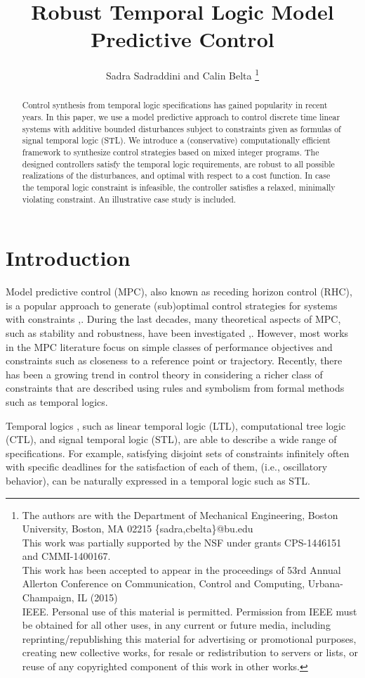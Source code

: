 \documentclass[letterpaper, 10 pt, conference]{ieeeconf}
\title{\LARGE \bf  Robust Temporal Logic Model Predictive Control}
\author{Sadra Sadraddini and Calin Belta 
\thanks{The authors are with the Department of Mechanical Engineering, Boston University, Boston, MA 02215 \{sadra,cbelta\}@bu.edu \\ This work was partially supported by the NSF under grants CPS-1446151 and CMMI-1400167.
\\
This work has been accepted to appear in the proceedings of 53rd Annual Allerton Conference on Communication, Control and Computing, Urbana-Champaign,
IL (2015)
\\
\textcopyright 2015 IEEE. Personal use of this material is permitted. Permission from IEEE must be obtained for all other uses, in any current or future media, including reprinting/republishing this material for advertising or promotional purposes, creating new collective works, for resale or redistribution to servers or lists, or reuse of any copyrighted component of this work in other works. 
}
}
\begin{document}
\maketitle

 \thispagestyle{empty}
\pagestyle{empty}
\makeatother


\begin{abstract}
Control synthesis from temporal logic specifications has gained popularity in recent years. 
In this paper, we use a model predictive approach to control discrete time linear systems with additive bounded disturbances subject to constraints given as formulas of signal temporal logic (STL). 
We introduce a (conservative) computationally efficient framework to synthesize control strategies based on mixed integer programs. The designed controllers satisfy the temporal logic requirements, are robust  to all possible realizations of the disturbances, and optimal with respect to a cost function. In case the temporal logic constraint is infeasible, the controller satisfies  a relaxed, minimally violating constraint.  An illustrative case study is included. 
\end{abstract}

\section{Introduction}
Model predictive control (MPC), also known as receding horizon control (RHC), is a popular approach to generate
(sub)optimal control strategies for systems with constraints \cite{garcia1989model},\cite{camacho2013model}. During the last decades, many theoretical aspects of MPC, such as stability and robustness, have been investigated \cite{Kothare1996},\cite{Mayne2000}. However, most works in the MPC literature focus on simple classes of performance objectives and constraints such as closeness to a reference point or trajectory. Recently, there has been a growing trend in control theory in considering a richer class of constraints that are described using rules and symbolism from formal methods such as temporal logics. 

Temporal logics \cite{Baier2008}, such as linear temporal logic (LTL), computational tree logic (CTL), and signal temporal logic (STL), are able to describe a wide range of specifications. For example, satisfying disjoint sets of constraints infinitely often with specific deadlines for the satisfaction of each of them, (i.e., oscillatory behavior), can be naturally expressed in a temporal logic such as STL. 
\end{document}
